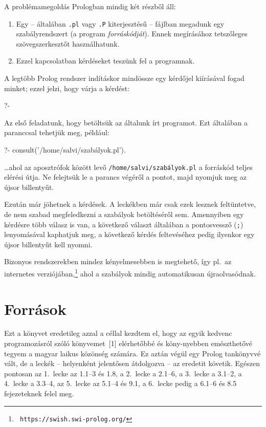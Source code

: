 A problémamegoldás Prologban mindig két részből áll:
\begin{enumerate}
\item Egy -- általában {\tt .pl} vagy {\tt .P} kiterjesztésű --
  fájlban megadunk egy szabályrendszert (a program
  \emph{forráskódját}). Ennek megírásához tetszőleges
  szövegszerkesztőt használhatunk.
\item Ezzel kapcsolatban kérdéseket teszünk fel a programnak.
\end{enumerate}
A legtöbb Prolog rendszer indításkor mindössze egy kérdőjel kiírásával
fogad minket; ezzel jelzi, hogy várja a kérdést:
\begin{query}
?-
\end{query}  
Az első feladatunk, hogy betöltsük az általunk írt programot. Ezt
általában a  paranccsal tehetjük meg, például:
\begin{query}
?- consult('/home/salvi/szabályok.pl').
\end{query}
\dots ahol az aposztrófok között levő {\tt /home/salvi/szabályok.pl} a
forráskód teljes elérési útja. Ne felejtsük le a parancs végéről a
pontot, majd nyomjuk meg az újsor billentyűt.

Ezután már jöhetnek a kérdések. A leckékben már csak ezek lesznek
feltüntetve, de nem szabad megfeledkezni a szabályok betöltéséről sem.
Amennyiben egy kérdésre több válasz is van, a következő választ
általában a pontosvessző ({\tt ;}) lenyomásával kaphatjuk meg, a
következő kérdés feltevéséhez pedig ilyenkor egy újsor billentyűt kell
nyomni.

Bizonyos rendszerekben mindez kényelmesebben is megtehető, így pl.~az
 internetes  verziójában,\footnote[2]{\tt
https://swish.swi-prolog.org/} ahol a szabályok mindig automatikusan
újraolvasódnak.

\section*{Források}
Ezt a könyvet eredetileg azzal a céllal kezdtem el, hogy az egyik
kedvenc programozásról szóló könyvemet~[1] elérhetőbbé és köny-nyebben
emészthetővé tegyem a magyar laikus közönség számára. Ez aztán végül
egy Prolog tankönyvvé vált, de a leckék -- helyenként jelentősen
átdolgozva -- az eredetit követik. Egészen pontosan az 1.~lecke az
1.1--3 és 1.8, a 2.~lecke a 2.1--6, a 3.~lecke a 3.1--2, a 4.~lecke a
3.3--4, az 5.~lecke az 5.1--4 és 9.1, a 6.~lecke pedig a 6.1--6 és 8.5
fejezeteknek felel meg.

